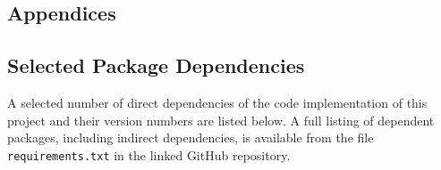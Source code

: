 \documentclass[a4paper,11pt,openany]{book}
\begin{document}
\begin{appendices}
\part{Appendices}
\label{sec:org0b93641}
\chapter{Selected Package Dependencies}
\label{sec:orgb5d788d}
\label{org9e17d4d}

A selected number of direct dependencies of the code implementation of this project and their version numbers are listed below.
A full listing of dependent packages, including indirect dependencies, is available from the file \texttt{requirements.txt} in the linked GitHub repository.


\end{appendices}
\end{document}
